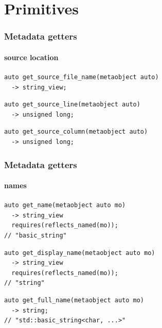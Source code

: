 \documentclass[compress,table,xcolor=table]{beamer}
\begin{document}
\section{Primitives}
\begin{frame}[fragile]
  \frametitle{Metadata getters}
  \framesubtitle{source location}
  \begin{lstlisting}[language=c++2x]
auto get_source_file_name(metaobject auto)
  -> string_view;
  \end{lstlisting}
  \vfill
  \begin{lstlisting}[language=c++2x,basicstyle=\footnotesize\ttfamily]
auto get_source_line(metaobject auto)
  -> unsigned long;
  \end{lstlisting}
  \vfill
  \begin{lstlisting}[language=c++2x,basicstyle=\footnotesize\ttfamily]
auto get_source_column(metaobject auto)
  -> unsigned long;
  \end{lstlisting}
\end{frame}
\begin{frame}[fragile]
  \frametitle{Metadata getters}
  \framesubtitle{names}
  \begin{lstlisting}[language=c++2x]
auto get_name(metaobject auto mo)
  -> string_view
  requires(reflects_named(mo));
// "basic_string"
  \end{lstlisting}
  \vfill
  \begin{lstlisting}[language=c++2x]
auto get_display_name(metaobject auto mo)
  -> string_view
  requires(reflects_named(mo));
// "string"
  \end{lstlisting}
  \vfill
  \begin{lstlisting}[language=c++2x]
auto get_full_name(metaobject auto mo)
  -> string;
// "std::basic_string<char, ...>"
  \end{lstlisting}
\end{frame}
\end{document}

